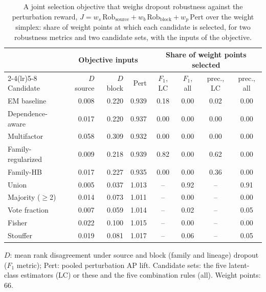 \begin{table}[htbp]
\centering
\small
\setlength{\tabcolsep}{4pt}
\caption{A joint selection objective that weighs dropout robustness against the perturbation reward, $J = w_s\,\mathrm{Rob}_{\mathrm{source}} + w_b\,\mathrm{Rob}_{\mathrm{block}} + w_p\,\mathrm{Pert}$ over the weight simplex: share of weight points at which each candidate is selected, for two robustness metrics and two candidate sets, with the inputs of the objective.}
\label{tab:S-tune-weights}
\begin{tabular}{@{}lrrrcccc@{}}
\toprule
 & \multicolumn{3}{c}{Objective inputs} & \multicolumn{4}{c}{Share of weight points selected} \\
\cmidrule(lr){2-4}\cmidrule(lr){5-8}
Candidate & $D$ source & $D$ block & Pert & $F_1$, LC & $F_1$, all & prec., LC & prec., all \\
\midrule
EM baseline & 0.008 & 0.220 & 0.939 & 0.18 & 0.00 & 0.02 & 0.00 \\
Dependence-aware & 0.017 & 0.220 & 0.937 & 0.00 & 0.00 & 0.00 & 0.00 \\
Multifactor & 0.058 & 0.309 & 0.932 & 0.00 & 0.00 & 0.00 & 0.00 \\
Family-regularized & 0.009 & 0.218 & 0.939 & 0.82 & 0.00 & 0.62 & 0.00 \\
Family-HB & 0.017 & 0.227 & 0.935 & 0.00 & 0.00 & 0.36 & 0.00 \\
Union & 0.005 & 0.037 & 1.013 & -- & 0.92 & -- & 0.91 \\
Majority ($\geq$2) & 0.014 & 0.073 & 1.011 & -- & 0.00 & -- & 0.00 \\
Vote fraction & 0.007 & 0.059 & 1.014 & -- & 0.02 & -- & 0.05 \\
Fisher & 0.022 & 0.100 & 1.015 & -- & 0.00 & -- & 0.00 \\
Stouffer & 0.019 & 0.081 & 1.017 & -- & 0.06 & -- & 0.05 \\
\bottomrule
\end{tabular}
\par\smallskip
\begin{minipage}{\linewidth}\footnotesize
$D$: mean rank disagreement under source and block (family and lineage) dropout ($F_1$ metric); Pert: pooled perturbation AP lift. Candidate sets: the five latent-class estimators (LC) or these and the five combination rules (all). Weight points: 66.
\end{minipage}
\end{table}
